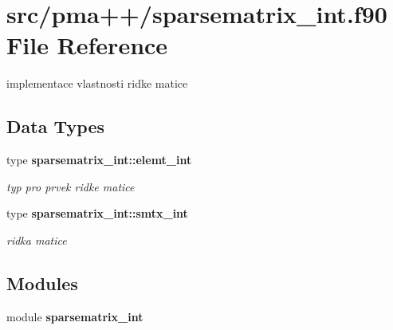 \section{src/pma++/sparsematrix\+\_\+int.f90 File Reference}
\label{sparsematrix__int_8f90}


implementace vlastnosti ridke matice  


\subsection*{Data Types}
\begin{DoxyCompactItemize}
\item 
type {\bf sparsematrix\+\_\+int\+::elemt\+\_\+int}
\begin{DoxyCompactList}\small\item\em typ pro prvek ridke matice \end{DoxyCompactList}\item 
type {\bf sparsematrix\+\_\+int\+::smtx\+\_\+int}
\begin{DoxyCompactList}\small\item\em ridka matice \end{DoxyCompactList}\end{DoxyCompactItemize}
\subsection*{Modules}
\begin{DoxyCompactItemize}
\item 
module {\bf sparsematrix\+\_\+int}
\end{DoxyCompactItemize}
